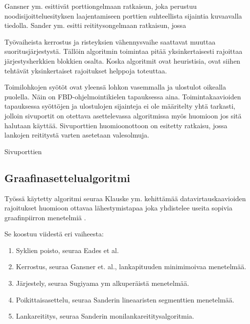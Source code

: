 \documentclass[finnish,12pt]{article}
\begin{document}
Gansner ym. esittivät porttiongelmaan ratkaisun, joka perustuu noodisijoitteluesityksen laajentamiseen porttien suhteellista sijaintia kuvaavalla tiedolla.\cite{RefWorks:28}
Sander ym. esitti reititysongelmaan ratkaisun, jossa 

Työvaiheista kerrostus ja risteyksien vähennysvaihe saattavat muuttaa suoritusjärjestystä.
Tällöin algoritmin toimintaa pitää yksinkertaisesti rajoittaa järjestysherkkien blokkien osalta.
Koska algoritmit ovat heuristisia, ovat siihen tehtävät yksinkertaiset rajoitukset helppoja toteuttaa.

Toimilohkojen syötöt ovat yleensä lohkon vasemmalla ja ulostulot oikealla puolella.
Näin on FBD-ohjelmointikielen tapauksessa aina.
Toimintakaavioiden tapauksessa syöttöjen ja ulostulojen sijainteja ei ole määritelty yhtä tarkasti, jolloin sivuportit on otettava asettelevassa algoritmissa myös huomioon jos sitä halutaan käyttää.
Sivuporttien huomioonottoon on esitetty ratkaisu, jossa lankojen reititystä varten asetetaan valesolmuja. \cite{RefWorks:51}
 
Sivuporttien 




		\subsection{Graafinasettelualgoritmi}

Työssä käytetty algoritmi seuraa Klauske ym. kehittämää datavirtauskaavioiden rajoitukset huomioon ottavaa lähestymistapaa joka yhdistelee useita sopivia graafinpiirron menetelmiä \cite{RefWorks:50}.

Se koostuu viidestä eri vaiheesta:
\begin{enumerate}
  \item Syklien poisto, seuraa Eades et al.\cite{RefWorks:48}
  \item Kerrostus, seuraa Gansner et. al., lankapituuden minimimoivaa menetelmää. \cite{RefWorks:28}
  \item Järjestely, seuraa Sugiyama ym alkuperäistä menetelmää. \cite{RefWorks:9}
  \item Poikittaisasettelu, seuraa Sanderin lineaaristen segmenttien menetelmää. \cite{RefWorks:49}
  \item Lankareititys, seuraa Sanderin monilankareititysalgoritmia. \cite{RefWorks:17}
\end{enumerate}
\end{document}
